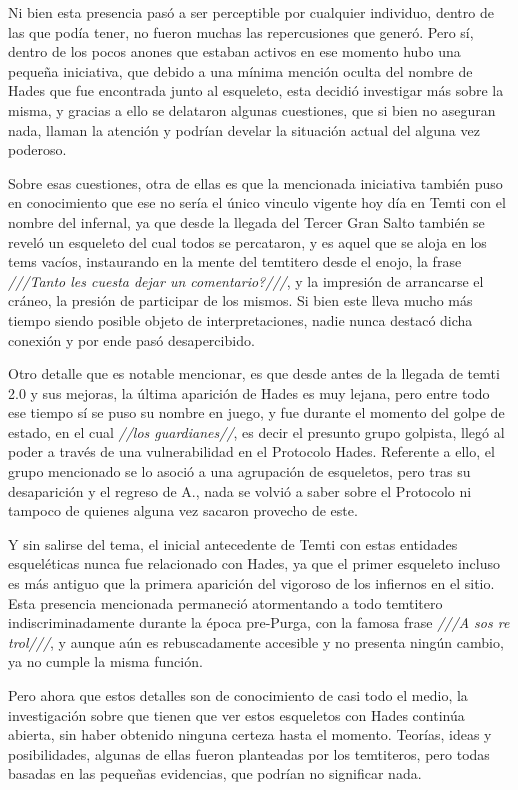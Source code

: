 \documentclass[
  spanish,
]{book}
\begin{document}
Ni bien esta presencia pasó a ser perceptible por cualquier individuo, dentro de las que podía tener, no fueron muchas las repercusiones que generó. Pero sí, dentro de los pocos anones que estaban activos en ese momento hubo una pequeña iniciativa, que debido a una mínima mención oculta del nombre de Hades que fue encontrada junto al esqueleto, esta decidió investigar más sobre la misma, y gracias a ello se delataron algunas cuestiones, que si bien no aseguran nada, llaman la atención y podrían develar la situación actual del alguna vez poderoso.

Sobre esas cuestiones, otra de ellas es que la mencionada iniciativa también puso en conocimiento que ese no sería el único vinculo vigente hoy día en Temti con el nombre del infernal, ya que desde la llegada del Tercer Gran Salto también se reveló un esqueleto del cual todos se percataron, y es aquel que se aloja en los tems vacíos, instaurando en la mente del temtitero desde el enojo, la frase \emph{///Tanto les cuesta dejar un comentario?///}, y la impresión de arrancarse el cráneo, la presión de participar de los mismos. Si bien este lleva mucho más tiempo siendo posible objeto de interpretaciones, nadie nunca destacó dicha conexión y por ende pasó desapercibido.

Otro detalle que es notable mencionar, es que desde antes de la llegada de temti 2.0 y sus mejoras, la última aparición de Hades es muy lejana, pero entre todo ese tiempo sí se puso su nombre en juego, y fue durante el momento del golpe de estado, en el cual \emph{//los guardianes//}, es decir el presunto grupo golpista, llegó al poder a través de una vulnerabilidad en el Protocolo Hades. Referente a ello, el grupo mencionado se lo asoció a una agrupación de esqueletos, pero tras su desaparición y el regreso de A., nada se volvió a saber sobre el Protocolo ni tampoco de quienes alguna vez sacaron provecho de este.

Y sin salirse del tema, el inicial antecedente de Temti con estas entidades esqueléticas nunca fue relacionado con Hades, ya que el primer esqueleto incluso es más antiguo que la primera aparición del vigoroso de los infiernos en el sitio. Esta presencia mencionada permaneció atormentando a todo temtitero indiscriminadamente durante la época pre-Purga, con la famosa frase \emph{///A sos re trol///}, y aunque aún es rebuscadamente accesible y no presenta ningún cambio, ya no cumple la misma función.

Pero ahora que estos detalles son de conocimiento de casi todo el medio, la investigación sobre que tienen que ver estos esqueletos con Hades continúa abierta, sin haber obtenido ninguna certeza hasta el momento. Teorías, ideas y posibilidades, algunas de ellas fueron planteadas por los temtiteros, pero todas basadas en las pequeñas evidencias, que podrían no significar nada.
\end{document}
